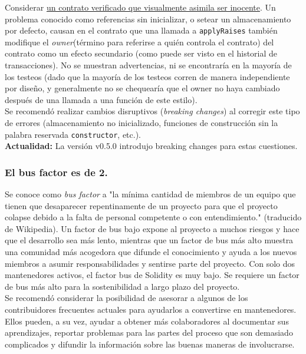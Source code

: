 Considerar \underline{un contrato verificado que visualmente asimila ser inocente}\cite{EtherscanRopstenContratoMalicioso}. Un problema conocido como referencias sin inicializar, o setear un almacenamiento por defecto, causan en el contrato que una llamada a \verb|applyRaises| también modifique el \textit{owner}(término para referirse a quién controla el contrato) del contrato como un efecto secundario (como puede ser visto en el historial de transacciones). No se muestran advertencias, ni se encontraría en la mayoría de los testeos (dado que la mayoría de los testeos corren de manera independiente por diseño, y generalmente no se chequearía que el owner no haya cambiado después de una llamada a una función de este estilo).\\

Se recomendó realizar cambios disruptivos (\textit{breaking changes}) al corregir este tipo de errores (almacenamiento no inicializado, funciones de construcción sin la palabra reservada \verb|constructor|, etc.).\\

\textbf{Actualidad:} La versión v0.5.0 introdujo breaking changes para estas cuestiones.

\subsubsection{El bus factor es de 2.}
Se conoce como \textit{bus factor} a "la mínima cantidad de miembros de un equipo que tienen que desaparecer repentinamente de un proyecto para que el proyecto colapse debido a la falta de personal competente o con entendimiento." (traducido de Wikipedia\cite{WikiBusFactor}). Un factor de bus bajo expone al proyecto a muchos riesgos y hace que el desarrollo sea más lento, mientras que un factor de bus más alto muestra una comunidad más acogedora que difunde el conocimiento y ayuda a los nuevos miembros a asumir responsabilidades y sentirse parte del proyecto. Con solo dos mantenedores activos\cite{GHContributors}, el factor bus de Solidity es muy bajo. Se requiere un factor de bus más alto para la sostenibilidad a largo plazo del proyecto.\\

Se recomendó considerar la posibilidad de asesorar a algunos de los contribuidores frecuentes actuales para ayudarlos a convertirse en mantenedores. Ellos pueden, a su vez, ayudar a obtener más colaboradores al documentar sus aprendizajes, reportar problemas para las partes del proceso que son demasiado complicados y difundir la información sobre las buenas maneras de involucrarse.\\

